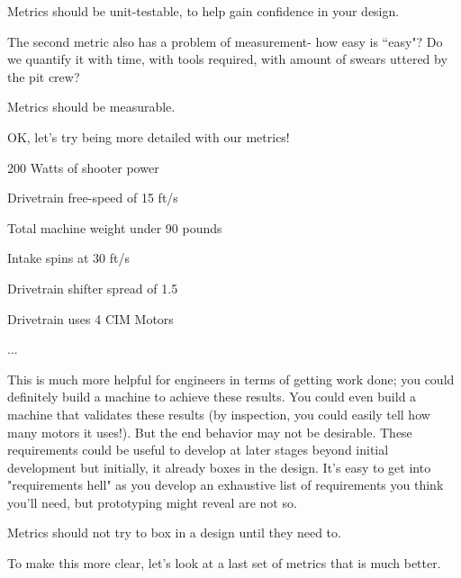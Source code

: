 \begin{theorem}
	Metrics should be unit-testable, to help gain confidence in your design.
\end{theorem}

The second metric also has a problem of measurement- how easy is ``easy"? Do we quantify it with time, with tools required, with amount of swears uttered by the pit crew?

\begin{theorem}
	Metrics should be measurable.
\end{theorem}

OK, let's try being more detailed with our metrics!

\begin{asparaenum}[1)]
	\item 200 Watts of shooter power
	\item Drivetrain free-speed of 15 ft/s
	\item Total machine weight under 90 pounds
	\item Intake spins at 30 ft/s
	\item Drivetrain shifter spread of 1.5
	\item Drivetrain uses 4 CIM Motors
	\item ...
\end{asparaenum}

This is much more helpful for engineers in terms of getting work done; you could definitely build a machine to achieve these results. You could even build a machine that validates these results (by inspection, you could easily tell how many motors it uses!). But the end behavior may not be desirable. These requirements could be useful to develop at later stages beyond initial development but initially, it already boxes in the design. It's easy to get into "requirements hell" as you develop an exhaustive list of requirements you think you'll need, but prototyping might reveal are not so.

\begin{theorem}
	Metrics should not try to box in a design until they need to.
\end{theorem}

To make this more clear, let's look at a last set of metrics that is much better.

